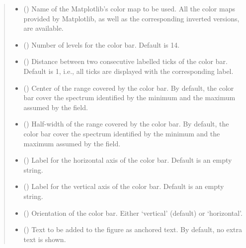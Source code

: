 \documentclass[letterpaper,10pt,english]{sphinxmanual}
\begin{document}
\begin{fulllineitems}
\begin{quote}
\begin{description}
\begin{itemize}
\item {} 
 () \textendash{} Name of the Matplotlib’s color map to be used. All the color maps provided by Matplotlib, as well as the corresponding inverted
versions, are available.

\item {} 
 () \textendash{} Number of levels for the color bar. Default is 14.

\item {} 
 () \textendash{} Distance between two consecutive labelled ticks of the color bar. Default is 1, i.e., all ticks are displayed with the
corresponding label.

\item {} 
 () \textendash{} Center of the range covered by the color bar. By default, the color bar cover the spectrum identified by the minimum
and the maximum assumed by the field.

\item {} 
 () \textendash{} Half-width of the range covered by the color bar. By default, the color bar cover the spectrum identified by the minimum
and the maximum assumed by the field.

\item {} 
 () \textendash{} Label for the horizontal axis of the color bar. Default is an empty string.

\item {} 
 () \textendash{} Label for the vertical axis of the color bar. Default is an empty string.

\item {} 
 () \textendash{} Orientation of the color bar. Either ‘vertical’ (default) or ‘horizontal’.

\item {} 
 () \textendash{} Text to be added to the figure as anchored text. By default, no extra text is shown.


\end{itemize}
\end{description}
\end{quote}
\end{fulllineitems}
\end{document}
